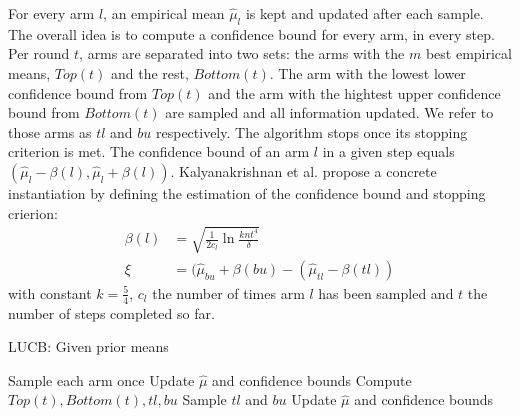 For every arm $l$, an empirical mean $\hat{\mu}_l$ is kept and updated after
each sample. The overall idea is to compute a confidence bound for every arm, in
every step. Per round $t$, arms are separated into two sets: the arms with the
$m$ best empirical means, $Top(t)$ and the rest, $Bottom(t)$. The arm with the
lowest lower confidence bound from $Top(t)$ and the arm with the hightest upper
confidence bound from $Bottom(t)$ are sampled and all information updated. We
refer to those arms as $tl$ and $bu$ respectively. The algorithm stops once its
stopping criterion is met. The confidence bound of an arm $l$ in a given step
equals $(\hat{\mu}_l - \beta(l), \hat{\mu}_l + \beta(l))$. Kalyanakrishnan et
al. \cite{DBLP:conf/icml/KalyanakrishnanTAS12} propose a concrete instantiation
by defining the estimation of the confidence bound and stopping crierion:
\begin{align}
  \beta(l) &= \sqrt{\frac{1}{2c_l}\ln\frac{knt^4}{\delta}} \\
  \xi &= (\hat{\mu}_{bu} + \beta(bu) - (\hat{\mu}_{tl} - \beta(tl))
\end{align}
with constant $k=\frac{5}{4}$, $c_l$ the number of times arm $l$ has been
sampled and $t$ the number of steps completed so far.
\begin{algorithm}[H]
    \caption{LUCB: Given prior means}
    \label{alg:LUCB}
  \begin{algorithmic}
    \State Sample each arm once
    \State Update $\hat{\mu}$ and confidence bounds
    \Repeat
      \State Compute $Top(t), Bottom(t), tl, bu$
      \State Sample $tl$ and $bu$
      \State Update $\hat{\mu}$ and confidence bounds
    \Until{$\xi < \epsilon$}
  \end{algorithmic}
\end{algorithm}
